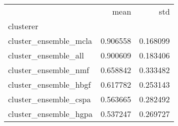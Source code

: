 \begin{tabular}{lrr}
\toprule
{} &      mean &       std \\
clusterer             &           &           \\
\midrule
cluster\_ensemble\_mcla &  0.906558 &  0.168099 \\
cluster\_ensemble\_all  &  0.900609 &  0.183406 \\
cluster\_ensemble\_nmf  &  0.658842 &  0.333482 \\
cluster\_ensemble\_hbgf &  0.617782 &  0.253143 \\
cluster\_ensemble\_cspa &  0.563665 &  0.282492 \\
cluster\_ensemble\_hgpa &  0.537247 &  0.269727 \\
\bottomrule
\end{tabular}

